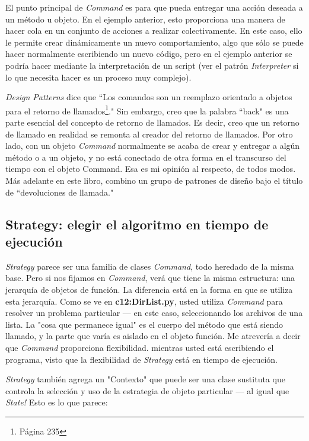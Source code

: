 El punto principal de \textit{Command} es para que pueda entregar una acción deseada a un método u objeto. En el ejemplo anterior, esto proporciona una manera de hacer cola en un conjunto de acciones a realizar colectivamente. En este caso, ello le permite crear dinámicamente un nuevo comportamiento, algo que sólo se puede hacer normalmente escribiendo un nuevo código, pero en el ejemplo anterior se podría hacer mediante la interpretación de un script (ver el patrón \textit{Interpreter} si lo que necesita hacer es un proceso muy complejo). \newline

\textit{Design Patterns} dice que “Los comandos son un reemplazo orientado a objetos para el retorno de llamados\footnote{Página 235}." Sin embargo, creo que la palabra “back" es una parte esencial del concepto de retorno de llamados. Es decir, creo que un retorno de llamado en realidad se remonta al creador del retorno de llamados. Por otro lado, con un objeto \textit{Command} normalmente se acaba de crear y entregar a algún método o a un objeto,  y no está conectado de otra forma en el transcurso del tiempo con el objeto Command. Esa es mi opinión al respecto, de todos modos. Más adelante en este libro, combino un grupo de patrones de diseño bajo el título de “devoluciones de llamada."  \newline

\subsection*{Strategy: elegir el algoritmo en tiempo de ejecución}
\label{subsec:eeeaetde}


\textit{Strategy} parece ser una familia de clases \textit{Command}, todo heredado de la misma base. Pero si nos fijamos en \textit{Command}, verá que tiene la misma estructura: una jerarquía de objetos de función. La diferencia está en la forma en que se utiliza esta jerarquía. Como se ve en \textbf{c12:DirList.py}, usted utiliza \textit{Command} para resolver un problema particular — en este caso, seleccionando los archivos de una lista. La "cosa que permanece igual" es el cuerpo del método que está siendo llamado, y la parte que varía es aislado en el objeto función. Me atrevería a decir que \textit{Command} proporciona flexibilidad. mientras usted está escribiendo el programa, visto que la flexibilidad de \textit{Strategy} está en tiempo de ejecución. 

\textit{Strategy} también agrega un "Contexto" que puede ser una clase sustituta que controla la selección y uso de la estrategia de objeto particular — al igual que \textit{State!} Esto es lo que parece:   \newpage


